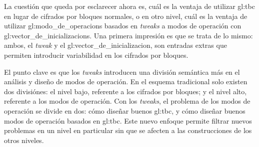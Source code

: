 
La cuestión que queda por esclarecer ahora es, cuál es la ventaja de utilizar
\gls{gl:tbc} en lugar de cifrados por bloques normales, o en otro nivel,
cuál es la ventaja de utilizar \glspl{gl:modo_de_operacion} basados en
\textit{tweaks} a modos de operación con \glspl{gl:vector_de_inicializacion}.
Una primera impresión es que se trata de lo mismo: ambos, el \textit{tweak} y
el \gls{gl:vector_de_inicializacion}, son entradas extras que permiten
introducir variabilidad en los cifrados por bloques.

El punto clave es que los \textit{tweaks} introducen una división semántica
más en el análisis y diseño de modos de operación. En el esquema tradicional
solo existen dos divisiónes: el nivel bajo, referente a los cifrados por
bloques; y el nivel alto, referente a los modos de operación. Con los
\textit{tweaks}, el problema de los modos de operación se divide en dos:
cómo diseñar buenos \gls{gl:tbc}, y cómo diseñar buenos modos de operación
basados en \gls{gl:tbc}. Este nuevo enfoque permite filtrar nuevos problemas
en un nivel en particular sin que se afecten a las construcciones de los otros
niveles.
